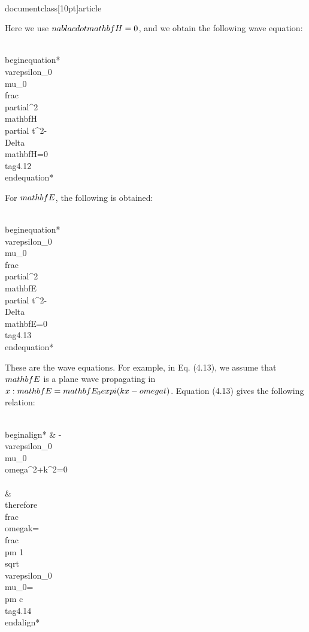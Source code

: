 \\documentclass[10pt]{article}
\begin{document}
Here we use $\\nabla \\cdot \\mathbf{H}=0$, and we obtain the following wave equation:


\\begin{equation*}
\\varepsilon_{0} \\mu_{0} \\frac{\\partial^{2} \\mathbf{H}}{\\partial t^{2}}-\\Delta \\mathbf{H}=0 \\tag{4.12}
\\end{equation*}


For $\\mathbf{E}$, the following is obtained:


\\begin{equation*}
\\varepsilon_{0} \\mu_{0} \\frac{\\partial^{2} \\mathbf{E}}{\\partial t^{2}}-\\Delta \\mathbf{E}=0 \\tag{4.13}
\\end{equation*}


These are the wave equations. For example, in Eq. (4.13), we assume that $\\mathbf{E}$ is a plane wave propagating in $x: \\mathbf{E}=\\mathbf{E}_{0} \\exp \\{i(k x-\\omega t)\\}$. Equation (4.13) gives the following relation:


\\begin{align*}
& -\\varepsilon_{0} \\mu_{0} \\omega^{2}+k^{2}=0 \\\\
& \\therefore \\frac{\\omega}{k}=\\frac{ \\pm 1}{\\sqrt{\\varepsilon_{0} \\mu_{0}}}= \\pm c \\tag{4.14}
\\end{align*}
\end{document}
